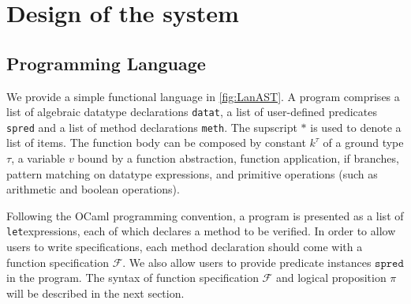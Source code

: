 
\chapter{Design of the system}
\label{ch:design}
\vspace{2em}


\section{Programming Language}

We provide a simple functional language in \autoref{fig:LanAST}. A program
comprises a list of algebraic datatype declarations \texttt{datat}, a list of user-defined predicates \texttt{spred} and a list of method declarations
\texttt{meth}. The supscript $*$ is used to denote a list of items. The function
body can be composed by constant $k^{\tau}$ of a ground type $\tau$, a variable $v$ bound by a function abstraction, 
function application, if branches, pattern matching on datatype
expressions, and primitive operations (such as arithmetic and boolean operations).

Following the OCaml programming convention, a program is presented as a 
list of \texttt{let}\zz{}expressions, each of which declares a method to be
verified. In order to allow users to write specifications, each method
declaration should come with a function specification $\mathcal{F}$. 
We also allow users to provide predicate instances $\texttt{spred}$ in
the program. The syntax of function specification $\mathcal{F}$ and 
logical proposition $\pi$ will be described in the next section.

